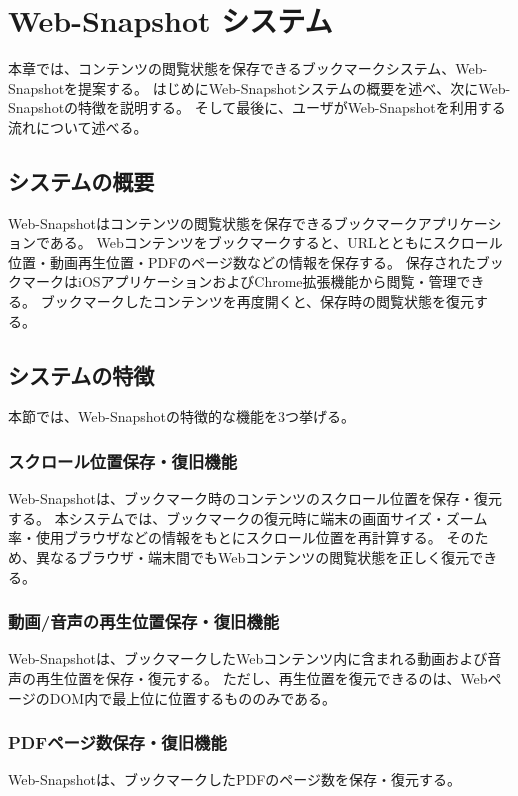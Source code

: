 \chapter{Web-Snapshot システム}
\label{chap:web_snapshot_system}
本章では、コンテンツの閲覧状態を保存できるブックマークシステム、Web-Snapshotを提案する。
はじめにWeb-Snapshotシステムの概要を述べ、次にWeb-Snapshotの特徴を説明する。
そして最後に、ユーザがWeb-Snapshotを利用する流れについて述べる。

\section{システムの概要}
Web-Snapshotはコンテンツの閲覧状態を保存できるブックマークアプリケーションである。
Webコンテンツをブックマークすると、URLとともにスクロール位置・動画再生位置・PDFのページ数などの情報を保存する。
保存されたブックマークはiOSアプリケーションおよびChrome拡張機能から閲覧・管理できる。
ブックマークしたコンテンツを再度開くと、保存時の閲覧状態を復元する。

\section{システムの特徴}
本節では、Web-Snapshotの特徴的な機能を3つ挙げる。

\subsection{スクロール位置保存・復旧機能}
Web-Snapshotは、ブックマーク時のコンテンツのスクロール位置を保存・復元する。
本システムでは、ブックマークの復元時に端末の画面サイズ・ズーム率・使用ブラウザなどの情報をもとにスクロール位置を再計算する。
そのため、異なるブラウザ・端末間でもWebコンテンツの閲覧状態を正しく復元できる。

\subsection{動画/音声の再生位置保存・復旧機能}
Web-Snapshotは、ブックマークしたWebコンテンツ内に含まれる動画および音声の再生位置を保存・復元する。
ただし、再生位置を復元できるのは、WebページのDOM内で最上位に位置するもののみである。

\subsection{PDFページ数保存・復旧機能}
Web-Snapshotは、ブックマークしたPDFのページ数を保存・復元する。


